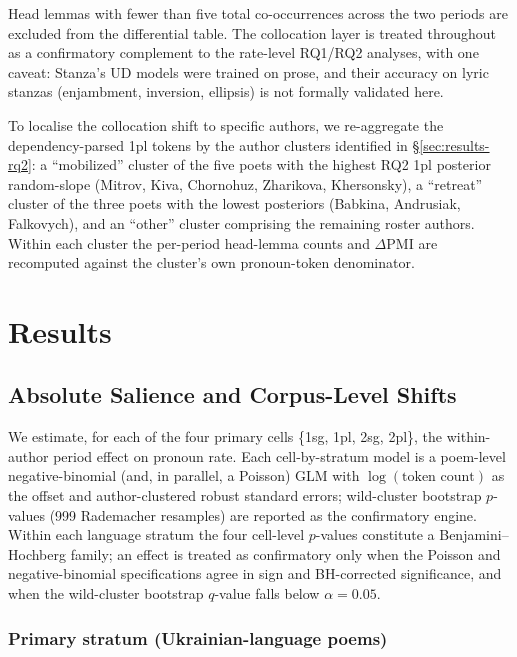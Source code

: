\documentclass[12pt]{interact}
\theoremstyle{plain}%
\theoremstyle{definition}
\theoremstyle{remark}
\begin{document}
Head lemmas with fewer than five total co-occurrences across the two periods are excluded from the differential table. The collocation layer is treated throughout as a confirmatory complement to the rate-level RQ1/RQ2 analyses, with one caveat: Stanza's UD models were trained on prose, and their accuracy on lyric stanzas (enjambment, inversion, ellipsis) is not formally validated here.

To localise the collocation shift to specific authors, we re-aggregate the dependency-parsed 1pl tokens by the author clusters identified in \S\ref{sec:results-rq2}: a ``mobilized'' cluster of the five poets with the highest RQ2 1pl posterior random-slope (Mitrov, Kiva, Chornohuz, Zharikova, Khersonsky), a ``retreat'' cluster of the three poets with the lowest posteriors (Babkina, Andrusiak, Falkovych), and an ``other'' cluster comprising the remaining roster authors. Within each cluster the per-period head-lemma counts and $\Delta\mathrm{PMI}$ are recomputed against the cluster's own pronoun-token denominator.


\section{Results}

\subsection{Absolute Salience and Corpus-Level Shifts}
\label{sec:results-rq1}

We estimate, for each of the four primary cells \{1sg, 1pl, 2sg, 2pl\}, the within-author period effect on pronoun rate. Each cell-by-stratum model is a poem-level negative-binomial (and, in parallel, a Poisson) GLM with $\log(\text{token count})$ as the offset and author-clustered robust standard errors; wild-cluster bootstrap $p$-values (999 Rademacher resamples) are reported as the confirmatory engine. Within each language stratum the four cell-level $p$-values constitute a Benjamini--Hochberg family; an effect is treated as confirmatory only when the Poisson and negative-binomial specifications agree in sign and BH-corrected significance, and when the wild-cluster bootstrap $q$-value falls below $\alpha = 0.05$.

\subsubsection{Primary stratum (Ukrainian-language poems)}
\end{document}
